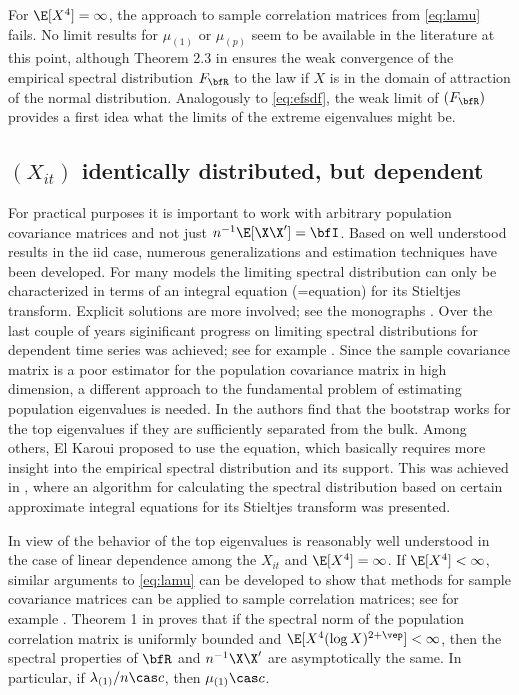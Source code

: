 For $\E[X^4]=\infty$, the approach to sample correlation matrices from \eqref{eq:lamu} fails. No limit results for $\mu_{(1)}$ or $\mu_{(p)}$ seem to be available in the literature at this point, although Theorem 2.3 in \cite{bai:zhou:2008} ensures the weak convergence of the empirical spectral distribution $F_{\bfR}$ to the \MP law if $X$ is in the domain of attraction of the normal distribution. Analogously to \eqref{eq:efsdf}, the weak limit of $(F_{\bfR})$ provides a first idea what the limits of the extreme eigenvalues might be. 

\subsection{$(X_{it})$ identically distributed, but dependent}
For practical purposes it is important to work with arbitrary population covariance matrices and not just $n^{-1} \E[\X\X']=\bfI$. Based on well understood results in the iid case, numerous generalizations and estimation techniques have been developed. For many models the limiting spectral distribution can only be characterized in terms of an integral equation (=\MP equation) for its Stieltjes transform. Explicit solutions are more involved; see the monographs \cite{bai:silverstein:2010,bai:fang:liang:2014,yao:zheng:bai:2015}. Over the last couple of years siginificant progress on limiting spectral distributions for dependent time series was achieved; see for example %
\cite{banna:merlevede:peligrad:2015,banna:merlevede:2015,banna:2016}.
Since the sample covariance matrix is a poor estimator for the population covariance matrix in high dimension, a different approach to the fundamental problem of estimating population eigenvalues is needed. In \cite{elkaroui:purdom:2016} the authors find that the bootstrap works for the top eigenvalues if they are sufficiently separated from the bulk. Among others, El Karoui \cite{elkaroui:2008} proposed to use the \MP equation, which basically requires more insight into the empirical spectral distribution and its support. This was achieved in \cite{dobriban:2015}, where an algorithm for calculating the spectral distribution based on certain approximate integral equations for its Stieltjes transform was presented.

In view of \cite{davis:pfaffel:stelzer:2014,davis:mikosch:pfaffel:2016,davis:mikosch:heiny:xie:2015} the behavior of the top eigenvalues is reasonably well understood in the case of linear dependence among the $X_{it}$ and $\E[X^4]=\infty$. 
If $\E[X^4]<\infty$, similar arguments to \eqref{eq:lamu} can be developed to show that methods for sample covariance matrices can be applied to sample correlation matrices; see for example \cite{elkaroui:2009}. Theorem 1 in \cite{elkaroui:2009} proves that if the spectral norm of the population correlation matrix is uniformly bounded and $\E[X^4 (\log X)^{2+\vep}]<\infty$, then the spectral properties of $\bfR$ and $n^{-1} \X\X'$ are asymptotically the same. In particular, if $\lambda_{(1)}/n\cas c$, then $\mu_{(1)}\cas c$.

